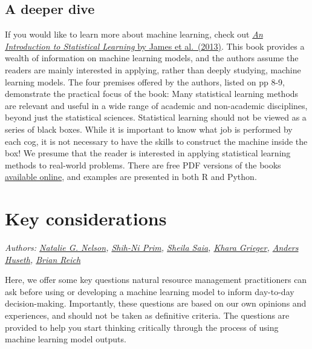 \documentclass[
]{book}
\begin{document}
\hypertarget{a-deeper-dive}{%
\section{A deeper dive}\label{a-deeper-dive}}

If you would like to learn more about machine learning, check out \href{https://www.statlearning.com/}{\emph{An Introduction to Statistical Learning} by James et al.~(2013)}. This book provides a wealth of information on machine learning models, and the authors assume the readers are mainly interested in applying, rather than deeply studying, machine learning models. The four premises offered by the authors, listed on pp 8-9, demonstrate the practical focus of the book:
Many statistical learning methods are relevant and useful in a wide range of academic and non-academic disciplines, beyond just the statistical sciences.
Statistical learning should not be viewed as a series of black boxes.
While it is important to know what job is performed by each cog, it is not necessary to have the skills to construct the machine inside the box!
We presume that the reader is interested in applying statistical learning methods to real-world problems.
There are free PDF versions of the books \href{https://www.statlearning.com/}{available online}, and examples are presented in both R and Python.

\hypertarget{key-considerations}{%
\chapter{Key considerations}\label{key-considerations}}

\emph{Authors: \href{https://bae.ncsu.edu/people/nnelson4/}{Natalie G. Nelson}, \href{https://www.linkedin.com/in/shih-ni-prim-14033336/}{Shih-Ni Prim}, \href{https://sheilasaia.rbind.io/}{Sheila Saia}, \href{https://cals.ncsu.edu/applied-ecology/people/kdgriege/}{Khara Grieger}, \href{https://cals.ncsu.edu/entomology-and-plant-pathology/people/ashuseth/}{Anders Huseth}, \href{https://statistics.sciences.ncsu.edu/people/bjreich/}{Brian Reich}}

Here, we offer some key questions natural resource management practitioners can ask before using or developing a machine learning model to inform day-to-day decision-making. Importantly, these questions are based on our own opinions and experiences, and should not be taken as definitive criteria. The questions are provided to help you start thinking critically through the process of using machine learning model outputs.
\end{document}
